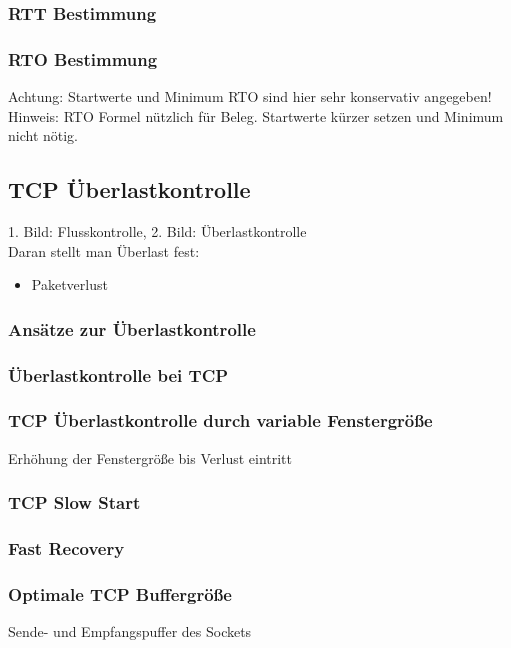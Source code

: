 \subsubsection*{RTT Bestimmung}
\subsubsection*{RTO Bestimmung}
Achtung: Startwerte und Minimum RTO sind hier sehr konservativ angegeben!\\
Hinweis: RTO Formel nützlich für Beleg. Startwerte kürzer setzen und Minimum nicht nötig.

\subsection{TCP Überlastkontrolle}
1. Bild: Flusskontrolle, 2. Bild: Überlastkontrolle\\
Daran stellt man Überlast fest:
\begin{itemize}
\item Paketverlust
\end{itemize}
\subsubsection{Ansätze zur Überlastkontrolle}
\subsubsection{Überlastkontrolle bei TCP}
\subsubsection{TCP Überlastkontrolle durch variable Fenstergröße}
Erhöhung der Fenstergröße bis Verlust eintritt
\subsubsection{TCP Slow Start}
\subsubsection{Fast Recovery}
\subsubsection{Optimale TCP Buffergröße}
Sende- und Empfangspuffer des Sockets
